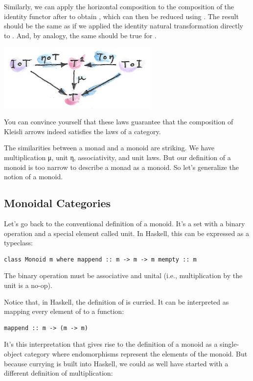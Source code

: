 Similarly, we can apply the horizontal composition  to the
composition of the identity functor  after  to
obtain , which can then be reduced using . The
result should be the same as if we applied the identity natural
transformation directly to . And, by analogy, the same should
be true for .

\includegraphics[width=3.12500in]{images/unitlawcomp-1.png}

You can convince yourself that these laws guarantee that the composition
of Kleisli arrows indeed satisfies the laws of a category.

The similarities between a monad and a monoid are striking. We have
multiplication μ, unit η, associativity, and unit laws. But our
definition of a monoid is too narrow to describe a monad as a monoid. So
let's generalize the notion of a monoid.

\subsection{Monoidal Categories}\label{monoidal-categories}

Let's go back to the conventional definition of a monoid. It's a set
with a binary operation and a special element called unit. In Haskell,
this can be expressed as a typeclass:

\begin{verbatim}
class Monoid m where mappend :: m -> m -> m mempty :: m
\end{verbatim}

The binary operation  must be associative and unital
(i.e., multiplication by the unit  is a no-op).

Notice that, in Haskell, the definition of  is curried.
It can be interpreted as mapping every element of  to a
function:

\begin{verbatim}
mappend :: m -> (m -> m)
\end{verbatim}

It's this interpretation that gives rise to the definition of a monoid
as a single-object category where endomorphisms
 represent the elements of the monoid.
But because currying is built into Haskell, we could as well have
started with a different definition of multiplication:

